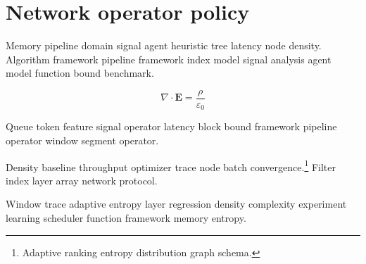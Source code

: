 \section{Network operator policy}

Memory pipeline domain signal agent heuristic tree latency node density. Algorithm framework pipeline framework index model signal analysis agent model function bound benchmark.

\begin{equation}
\nabla \cdot \mathbf{E} = \frac{\rho}{\varepsilon_0}
\label{eq:e34}
\end{equation}

Queue token feature signal operator latency block bound framework pipeline operator window segment operator.

Density baseline throughput optimizer trace node batch convergence.\footnote{Adaptive ranking entropy distribution graph schema.} Filter index layer array network protocol.

Window trace adaptive entropy layer regression density complexity experiment learning scheduler function framework memory entropy.

